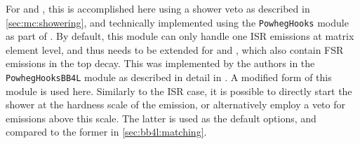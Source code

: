 For \hvq and \ST, this is accomplished here using a shower veto as described in \cref{sec:mc:showering}, and technically implemented using the \texttt{PowhegHooks} module as part of \pythia. By default, this module can only handle one ISR emissions at matrix element level, and thus needs to be extended for \bbfourl and \ttb, which also contain FSR emissions in the top decay. This was implemented by the \bbfourl authors in the \texttt{PowhegHooksBB4L} module as described in detail in . A modified form of this module is used here. Similarly to the ISR case, it is possible to directly start the shower at the hardness scale of the \powheg emission, or alternatively employ a veto for emissions above this scale. The latter is used as the default options, and compared to the former in \cref{sec:bb4l:matching}.




